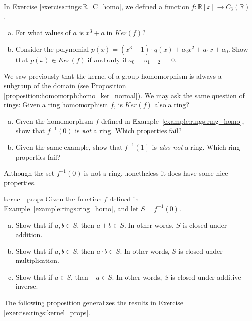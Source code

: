\begin{exercise}{}
In Exercise \ref{exercise:rings:R_C_homo}, we defined a function $f:{\mathbb R}[x]\rightarrow C_3({\mathbb R})$.
\begin{enumerate}[(a)]
\item For what values of $a$ is $x^3+a$ in $Ker(f)$?
\item Consider the polynomial $p(x)=(x^3-1)\cdot q(x)+a_2x^2+a_1x+a_0$.  Show that $p(x)\in Ker(f)$ if and only if $a_0=a_1=_2=0$.
\end{enumerate}
\end{exercise}

We saw previously that the kernel of a group homomorphism is always a subgroup of the domain (see Proposition \ref{proposition:homomorph:homo_ker_normal}).  We may ask the same question of rings:  Given a ring homomorphism $f$, is $Ker(f)$ also a ring?

\begin{exercise}{}
\begin{enumerate}[(a)]
    \item Given the homomorphism $f$ defined in Example~\ref{example:rings:ring_homo}, show that $f^{-1}(0)$ is \emph{not} a ring.  Which properties fail?
    \item Given the same example, show that $f^{-1}(1)$ is \emph{also not} a ring.  Which ring properties fail?
\end{enumerate}
\end{exercise}

Although the set $f^{-1}(0)$ is not a ring, nonetheless it does have some nice properties.

\begin{exercise}{kernel_props}
Given the function $f$ defined in Example~\ref{example:rings:ring_homo}, and let $S=f^{-1}(0)$.
\begin{enumerate}[(a)]
\item Show that if $a,b \in S$, then $a+b \in S$.  In other words, $S$ is closed under addition.
\item Show that if $a,b \in S$, then $a\cdot b \in S$.  In other words, $S$ is closed under multiplication.

\item Show that if $a \in S$, then $-a \in S$.  In other words, $S$ is closed under additive inverse.
\end{enumerate}
\end{exercise}

The following proposition generalizes the results in Exercise \ref{exercise:rings:kernel_props}.

